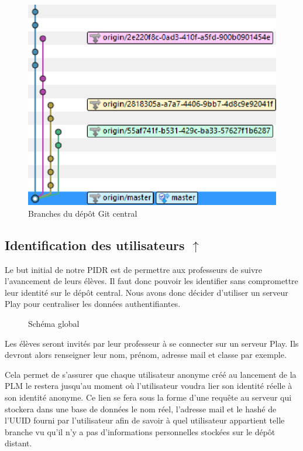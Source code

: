\begin{figure}[!h]
\begin{center}
\includegraphics[scale=0.75]{images/tree.eps}
    \caption{Branches du dépôt Git central}
    \label{gitBranch}
\end{center}
\end{figure}

\subsection[Identification des utilisateurs]{Identification des utilisateurs \hyperref[identifPb]{$\uparrow$}}
\label{identifSol}

Le but initial de notre PIDR est de permettre aux professeurs de suivre l'avancement de leurs élèves. Il faut donc pouvoir les identifier sans compromettre leur identité sur le dépôt central. Nous avons donc décider d'utiliser un serveur Play\cite{PlaySite} pour centraliser les données authentifiantes.

\begin{figure}[!h]
\begin{center}
	
    \caption{Schéma global}
    \label{schemaGlobal}
\end{center}
\end{figure}


Les élèves seront invités par leur professeur à se connecter sur un serveur Play. Ils devront alors renseigner leur nom, prénom, adresse mail et classe par exemple.

Cela permet de s'assurer que chaque utilisateur \og anonyme\fg{} créé au lancement de la PLM le restera jusqu'au moment où l'utilisateur voudra lier son identité réelle à son identité anonyme. Ce lien se fera sous la forme d'une requête au serveur qui stockera dans une base de données le nom réel, l'adresse mail et le hashé de l'UUID fourni par l'utilisateur afin de savoir à quel utilisateur appartient telle branche vu qu'il n'y a pas d'informations personnelles stockées sur le dépôt distant.

